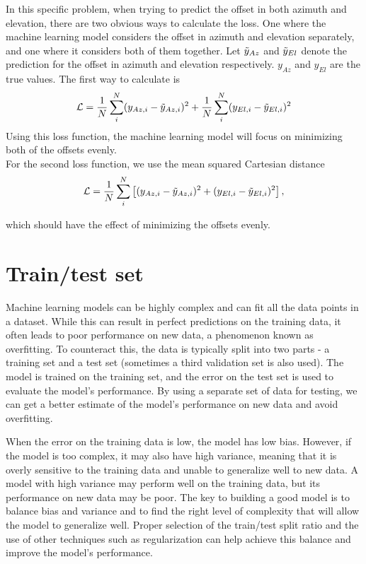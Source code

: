 In this specific problem, when trying to predict the offset in both azimuth and elevation, there are two obvious ways to calculate the loss.
One where the machine learning model considers the offset in azimuth and elevation separately, and one where it considers both of them together.
Let $\Tilde{y}_{Az}$ and $\Tilde{y}_{El}$ denote the prediction for the offset in azimuth and elevation respectively.
$y_{Az}$ and $y_{El}$ are the true values.
The first way to calculate is 
\begin{equation}\label{eq:mse1}
    \mathcal{L} = \frac{1}{N}\sum_i^N (y_{Az,i}-\Tilde{y}_{Az,i})^2 + \frac{1}{N}\sum_i^N (y_{El,i}-\Tilde{y}_{El,i})^2
\end{equation}
Using this loss function, the machine learning model will focus on minimizing both of the offsets evenly.\\

For the second loss function, we use the mean squared Cartesian distance
\begin{equation}\label{eq:totaloff}
    \mathcal{L} = \frac{1}{N}\sum_i^N \left[ (y_{Az,i}-\Tilde{y}_{Az,i})^2 + (y_{El,i}-\Tilde{y}_{El,i})^2 \right],
\end{equation}

which should have the effect of minimizing the offsets evenly.

\section{Train/test set}
Machine learning models can be highly complex and can fit all the data points in a dataset.
While this can result in perfect predictions on the training data, it often leads to poor performance on new data, a phenomenon known as overfitting.
To counteract this, the data is typically split into two parts - a training set and a test set (sometimes a third validation set is also used).
The model is trained on the training set, and the error on the test set is used to evaluate the model's performance.
By using a separate set of data for testing, we can get a better estimate of the model's performance on new data and avoid overfitting.

When the error on the training data is low, the model has low bias.
However, if the model is too complex, it may also have high variance, meaning that it is overly sensitive to the training data and unable to generalize well to new data.
A model with high variance may perform well on the training data, but its performance on new data may be poor.
The key to building a good model is to balance bias and variance and to find the right level of complexity that will allow the model to generalize well.
Proper selection of the train/test split ratio and the use of other techniques such as regularization can help achieve this balance and improve the model's performance.



